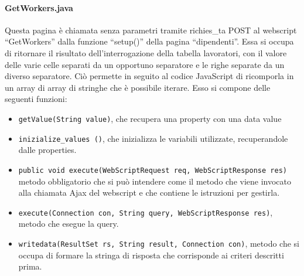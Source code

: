 \paragraph{GetWorkers.java}
Questa pagina è chiamata senza parametri tramite richies\_ta POST al webscript “GetWorkers” dalla funzione “setup()” della pagina “dipendenti”. Essa si occupa di ritornare il risultato dell’interrogazione della tabella lavoratori, con il valore delle varie celle separati da un opportuno separatore e le righe separate da un diverso separatore. Ciò permette in seguito al codice JavaScript di ricomporla in un array di array di stringhe  che è possibile iterare.
Esso si compone delle seguenti funzioni:
\begin{itemize}
\item \texttt{getValue(String value)}, che recupera una property con una data value
\item \texttt{inizialize\_values ()}, che inizializza le variabili utilizzate, recuperandole dalle properties.
\item \texttt{public void execute(WebScriptRequest req, WebScriptResponse res)} metodo obbligatorio che si può intendere come il metodo che viene invocato alla chiamata Ajax del webscript e che contiene le istruzioni per gestirla.
\item \texttt{execute(Connection con, String query, WebScriptResponse res)}, metodo che esegue la query.
\item \texttt{writedata(ResultSet rs, String result, Connection con)}, metodo che si occupa di formare la stringa di risposta che corrisponde ai criteri descritti prima.
\end{itemize}
